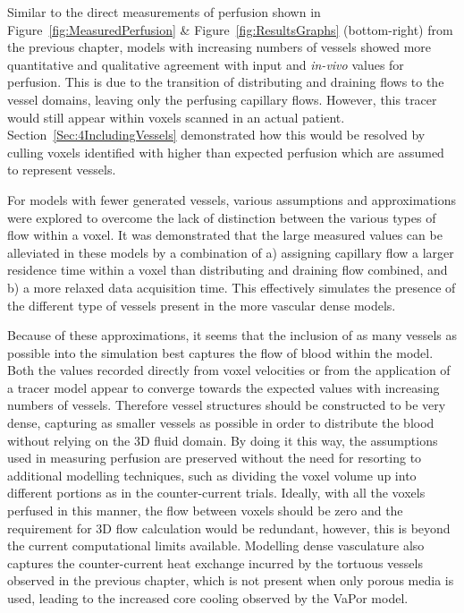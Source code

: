 \documentclass[11pt,english,a4paper,twoside,openright]{report}
\begin{document}
{{{{{{{Similar to the direct measurements of perfusion shown in Figure~\ref{fig:MeasuredPerfusion} \& Figure~\ref{fig:ResultsGraphs} (bottom-right) from the previous chapter, models with increasing numbers of vessels showed more quantitative and qualitative agreement with input and \textit{in-vivo} values for perfusion. This is due to the transition of distributing and draining flows to the vessel domains, leaving only the perfusing capillary flows. However, this tracer would still appear within voxels scanned in an actual patient. Section~\ref{Sec:4IncludingVessels} demonstrated how this would be resolved by culling voxels identified with higher than expected perfusion which are assumed to represent vessels.

For models with fewer generated vessels, various assumptions and approximations were explored to overcome the lack of distinction between the various types of flow within a voxel. It was demonstrated that the large measured values can be alleviated in these models by a combination of a) assigning capillary flow a larger residence time within a voxel than distributing and draining flow combined, and b) a more relaxed data acquisition time. This effectively simulates the presence of the different type of vessels present in the more vascular dense models. 

Because of these approximations, it seems that the inclusion of as many vessels as possible into the simulation best captures the flow of blood within the model. Both the values recorded directly from voxel velocities or from the application of a tracer model appear to converge towards the expected values with increasing numbers of vessels. Therefore vessel structures should be constructed to be very dense, capturing as smaller vessels as possible in order to distribute the blood without relying on the 3D fluid domain. By doing it this way, the assumptions used in measuring perfusion are preserved without the need for resorting to additional modelling techniques, such as dividing the voxel volume up into different portions as in the counter-current trials. Ideally, with all the voxels perfused in this manner, the flow between voxels should be zero and the requirement for 3D flow calculation would be redundant, however, this is beyond the current computational limits available. Modelling dense vasculature also captures the counter-current heat exchange incurred by the tortuous vessels observed in the previous chapter, which is not present when only porous media is used, leading to the increased core cooling observed by the VaPor model.


}}}}}}}
\end{document}
